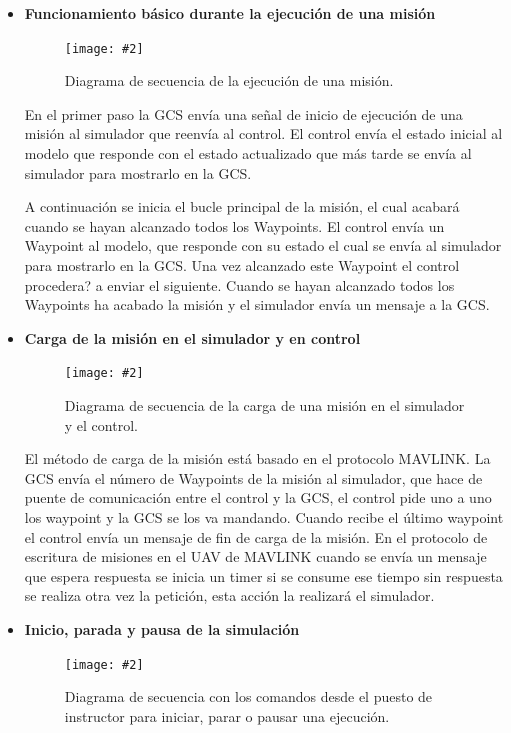 \documentclass[12pt,a4paper,spanish]{book} %
\newcommand{\imgCentradaGrande}[3]{
\begin{figure}[H]
\begin{center}
\texttt{[image: \#2]}
\caption{#3}
\label{#1}
\end{center}
\end{figure}
}
\begin{document}
\begin{itemize}
\item\textbf{Funcionamiento básico durante la ejecución de una misión}

\imgCentradaGrande{fig.4.2}{img/funcionamientobasicomision.eps}{Diagrama de secuencia de la ejecución de una misión.}

En el primer paso la GCS envía una señal de inicio de ejecución de una misión al simulador que reenvía al control. El control envía el estado inicial al modelo que responde con el estado actualizado que más tarde se envía al simulador para mostrarlo en la GCS.

A continuación se inicia el bucle principal de la misión, el cual acabará cuando se hayan alcanzado todos los Waypoints. El control envía un Waypoint al modelo, que responde con su estado el cual se envía al simulador para mostrarlo en la GCS. Una vez alcanzado este Waypoint el control procedera? a enviar el siguiente. Cuando se hayan alcanzado todos los Waypoints ha acabado la misión y el simulador envía un mensaje a la GCS.

\item\textbf{Carga de la misión en el simulador y en control}

\imgCentradaGrande{fig.4.3}{img/cargamision.eps}{Diagrama de secuencia de la carga de una misión en el simulador y el control.}

El método de carga de la misión está basado en el protocolo MAVLINK. La GCS envía el número de Waypoints de la misión al simulador, que hace de puente de comunicación entre el control y la GCS, el control pide uno a uno los waypoint y la GCS se los va mandando. Cuando recibe el último waypoint el control envía un mensaje de fin de carga de la misión. En el protocolo de escritura de misiones en el UAV de MAVLINK cuando se envía un mensaje que espera respuesta se inicia un timer si se consume ese tiempo sin respuesta se realiza otra vez la petición, esta acción la realizará el simulador.

\item\textbf{Inicio, parada y pausa de la simulación}

\imgCentradaGrande{fig.4.4}{img/iniciopausaparada.eps}{Diagrama de secuencia con los comandos desde el puesto de instructor para iniciar, parar o pausar una ejecución.}


\end{itemize}
\end{document}
